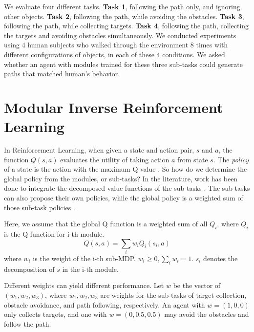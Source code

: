 \documentclass[11pt]{article} %
\begin{document}
We evaluate four different tasks. {\bf Task 1}, following the path only, and
ignoring other objects. {\bf Task 2}, following the path, while avoiding the
obstacles.  {\bf Task 3}, following the path, while collecting targets. {\bf
Task 4}, following the path, collecting the targets and avoiding obstacles
simultaneously.  We conducted experiments using 4 human subjects who walked
through the environment 8 times with different configurations of objects, in
each of these 4 conditions.  We asked whether an agent with modules trained for
these three sub-tasks could generate paths that matched human's behavior.

\section{Modular Inverse Reinforcement Learning}
\label{sec:rl}

In Reinforcement Learning, when given a state and action pair, $s$ and $a$, the
function $Q(s, a)$ evaluates the utility of taking action $a$ from state $s$.
The {\em policy} of a state is the action with the maximum Q value \cite{rl}. So
how do we determine the global policy from the modules, or sub-tasks? In the
literature, work has been done to integrate the decomposed value functions of
the sub-tasks \cite{koller1999computing}. The sub-tasks can also propose their
own policies, while the global policy is a weighted sum of those sub-task
policies \cite{thomas2012motor}.

Here, we assume that the global Q function is a weighted sum of all $Q_i$, where
$Q_i$ is the Q function for i-th module.
$$Q(s, a) = \sum_i w_i Q_i (s_i, a)$$
where $w_i$ is the weight of the i-th sub-MDP. $w_i \geq 0, \sum_i w_i = 1$.
$s_i$ denotes the decomposition of $s$ in the i-th module.

Different weights can yield different performance. Let $w$ be the vector of
$(w_1, w_2, w_3)$, where $w_1, w_2, w_3$ are weights for the sub-tasks of target
collection, obstacle avoidance, and path following, respectively. An agent with
$w = (1, 0, 0)$ only collects targets, and one with $w = (0, 0.5, 0.5)$ may
avoid the obstacles and follow the path.
\end{document}
